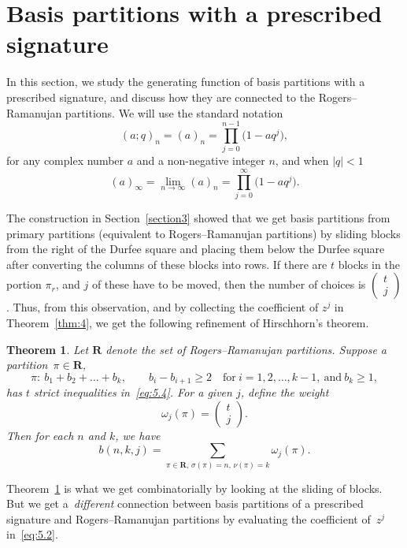 \documentclass[10pt,a4paper]{amsart}
\numberwithin{equation}{section}
\newtheorem{Theorem}{Theorem}[section]
\theoremstyle{definition}
\newcommand{\bin}[2]{\left(\begin{matrix} #1 \\ #2 \end{matrix} \right)}
\begin{document}
\section{Basis partitions with a prescribed signature}\label{section7}

In this section, we study the generating function of basis partitions
with a prescribed signature, and discuss how they are connected to
the Rogers--Ramanujan partitions. We will use the standard notation
\[
(a;q)_n=(a)_n=\prod^{n-1}_{j=0}\bigl(1-aq^j\bigr),
\]
for any complex number $a$ and a non-negative integer $n$, and when $|q|<1$
\[
(a)_{\infty}=\lim_{n\to\infty}(a)_n=\prod^{\infty}_{j=0}\bigl(1-aq^j\bigr).
\]

The construction in Section~\ref{section3} showed that we get basis partitions
from primary partitions (equivalent to Rogers--Ramanujan partitions)
by sliding blocks from the right of the Durfee square and placing them
below the Durfee square after converting the columns of these blocks
into rows. If there are $t$ blocks in the portion $\pi_r$, and $j$ of
these have to be moved, then the number of choices is
$\left(\begin{smallmatrix} t\\ j\end{smallmatrix}\right)$.
Thus, from this observation, and by collecting the coefficient of $z^j$
in Theorem~\ref{thm:4}, we get the following refinement of Hirschhorn's theorem.

\begin{Theorem}\label{thm:5}
Let $\mathbf{R}$ denote the set of Rogers--Ramanujan partitions.
Suppose a partition~${\pi\!\in\! \mathbf{R}}$,
\begin{equation*}
\pi\colon\ b_1+b_2+\dots +b_k, \qquad b_i-b_{i+1}\ge 2 \quad \text{for} \
i=1,2,\dots , k-1, \ \text{and} \ b_k\ge 1,%
\end{equation*}
has $t$ strict inequalities in~\eqref{eq:5.4}. For a given $j$, define the weight
\[
\omega_j(\pi)=\bin{t}{j}.
\]
Then for each $n$ and $k$, we have
\[
b(n,k,j)=\sum_{\pi\in \mathbf{R},\, \sigma(\pi)=n,\, \nu(\pi)=k}\omega_j(\pi).
\]
\end{Theorem}

Theorem~\ref{thm:5} is what we get combinatorially by looking at the sliding
of blocks. But we get a~{\it different} connection between
basis partitions of a prescribed signature and Rogers--Ramanujan partitions
by evaluating the coefficient of~$z^j$ in~\eqref{eq:5.2}.
\end{document}
